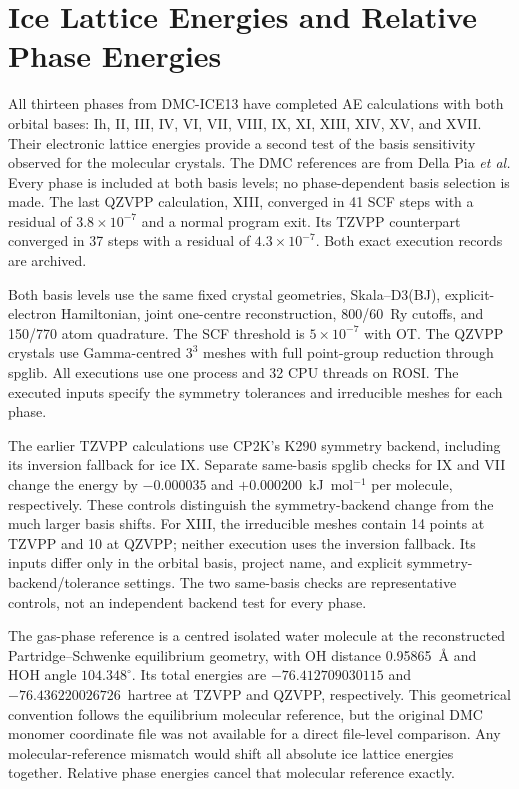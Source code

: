 \section{Ice Lattice Energies and Relative Phase Energies}
\label{sec:ice-basis}

All thirteen phases from DMC-ICE13 have completed AE calculations with both orbital bases: Ih, II, III, IV, VI, VII, VIII, IX, XI, XIII, XIV, XV, and XVII. Their electronic lattice energies provide a second test of the basis sensitivity observed for the molecular crystals. The DMC references are from Della Pia \emph{et al.}\cite{DellaPia2022Ice} Every phase is included at both basis levels; no phase-dependent basis selection is made. The last QZVPP calculation, XIII, converged in 41 SCF steps with a residual of $3.8\times10^{-7}$ and a normal program exit. Its TZVPP counterpart converged in 37 steps with a residual of $4.3\times10^{-7}$. Both exact execution records are archived.

Both basis levels use the same fixed crystal geometries, Skala--D3(BJ), explicit-electron Hamiltonian, joint one-centre reconstruction, 800/60~Ry cutoffs, and 150/770 atom quadrature. The SCF threshold is $5\times10^{-7}$ with OT. The QZVPP crystals use Gamma-centred $3^3$ meshes with full point-group reduction through spglib. All executions use one process and 32 CPU threads on ROSI. The executed inputs specify the symmetry tolerances and irreducible meshes for each phase.

The earlier TZVPP calculations use CP2K's K290 symmetry backend, including its inversion fallback for ice IX. Separate same-basis spglib checks for IX and VII change the energy by $-0.000035$ and $+0.000200$~kJ~mol$^{-1}$ per molecule, respectively. These controls distinguish the symmetry-backend change from the much larger basis shifts. For XIII, the irreducible meshes contain 14 points at TZVPP and 10 at QZVPP; neither execution uses the inversion fallback. Its inputs differ only in the orbital basis, project name, and explicit symmetry-backend/tolerance settings. The two same-basis checks are representative controls, not an independent backend test for every phase.

The gas-phase reference is a centred isolated water molecule at the reconstructed Partridge--Schwenke equilibrium geometry, with OH distance 0.95865~\AA{} and HOH angle $104.348^\circ$.\cite{Gillan2012WaterClusters} Its total energies are $-76.412709030115$ and $-76.436220026726$~hartree at TZVPP and QZVPP, respectively. This geometrical convention follows the equilibrium molecular reference, but the original DMC monomer coordinate file was not available for a direct file-level comparison. Any molecular-reference mismatch would shift all absolute ice lattice energies together. Relative phase energies cancel that molecular reference exactly.

